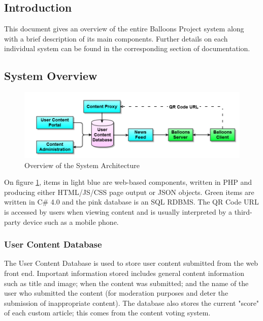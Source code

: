 \subsection{Introduction}
This document gives an overview of the entire Balloons Project system along 
with a brief description of its main components. Further details on each 
individual system can be found in the corresponding section of documentation.

\subsection{System Overview}

\begin{figure}[h]
\begin{centering}
\includegraphics[width=\textwidth]{Diagrams/System-Architecture-Diagram.png}
\par\end{centering}

\caption{Overview of the System Architecture}
\label{Flo:SystemArch}
\end{figure}

On figure \ref{Flo:SystemArch}, items in light blue are web-based components, written in PHP and producing 
either HTML/JS/CSS page output or JSON objects. Green items are written in C\#
4.0 and the pink database is an SQL RDBMS. The QR Code URL is accessed by users
when viewing content and is usually interpreted by a third-party device such as
a mobile phone.

\subsubsection{User Content Database}
The User Content Database is used to store user content submitted from the web
front end. Important information stored includes general content information 
such as title and image; when the content was submitted; and the name of the 
user who submitted the content (for moderation purposes and deter the 
submission of inappropriate content). The database also stores the current 
"score" of each custom article; this comes from the content voting system. 

